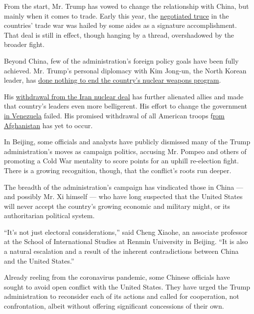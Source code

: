 From the start, Mr. Trump has vowed to change the relationship with
China, but mainly when it comes to trade. Early this year, the
\href{https://www.nytimes3xbfgragh.onion/2020/01/15/business/economy/china-trade-deal.html}{negotiated
truce} in the countries' trade war was hailed by some aides as a
signature accomplishment. That deal is still in effect, though hanging
by a thread, overshadowed by the broader fight.

Beyond China, few of the administration's foreign policy goals have been
fully achieved. Mr. Trump's personal diplomacy with Kim Jong-un, the
North Korean leader, has
\href{https://www.nytimes3xbfgragh.onion/2020/06/12/world/asia/korea-nuclear-trump-kim.html?searchResultPosition=5}{done
nothing to end the country's nuclear weapons program}.

His
\href{https://www.nytimes3xbfgragh.onion/2018/05/08/us/politics/trump-speech-iran-deal.html?searchResultPosition=40}{withdrawal
from the Iran nuclear deal} has further alienated allies and made that
country's leaders even more belligerent. His effort to change the
government
\href{https://www.nytimes3xbfgragh.onion/2020/03/31/world/americas/coronavirus-venezuela-maduro-guaido.html?searchResultPosition=2}{in
Venezuela} failed. His promised withdrawal of all American troops
f\href{https://www.nytimes3xbfgragh.onion/2020/05/26/world/asia/afghanistan-troop-withdrawal-election-day.html?searchResultPosition=2}{rom
Afghanistan} has yet to occur.

In Beijing, some officials and analysts have publicly dismissed many of
the Trump administration's moves as campaign politics, accusing Mr.
Pompeo and others of promoting a Cold War mentality to score points for
an uphill re-election fight. There is a growing recognition, though,
that the conflict's roots run deeper.

The breadth of the administration's campaign has vindicated those in
China --- and possibly Mr. Xi himself --- who have long suspected that
the United States will never accept the country's growing economic and
military might, or its authoritarian political system.

``It's not just electoral considerations,'' said Cheng Xiaohe, an
associate professor at the School of International Studies at Renmin
University in Beijing. ``It is also a natural escalation and a result of
the inherent contradictions between China and the United States.''

Already reeling from the coronavirus pandemic, some Chinese officials
have sought to avoid open conflict with the United States. They have
urged the Trump administration to reconsider each of its actions and
called for cooperation, not confrontation, albeit without offering
significant concessions of their own.

